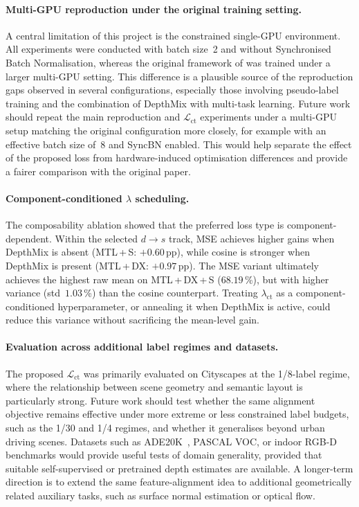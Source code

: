 \documentclass[
  oneside,
  author={Shijie Lu},
  degree={BSc},
  title={Label-Efficient Semantic Segmentation via Self-Supervised Depth Estimation and Cross-Task Consistency},
  unit={COMS30045},
  subtitle={}
]{dissertation}
\begin{document}
\paragraph{Multi-GPU reproduction under the original training setting.}
A central limitation of this project is the constrained single-GPU
environment. All experiments were conducted with batch size~2 and without
Synchronised Batch Normalisation, whereas the original framework of
\cite{hoyer2023improving} was trained under a larger multi-GPU setting.
This difference is a plausible source of the reproduction gaps observed
in several configurations, especially those involving pseudo-label
training and the combination of DepthMix with multi-task learning. Future
work should repeat the main reproduction and $\mathcal{L}_\text{ct}$
experiments under a multi-GPU setup matching the original configuration
more closely, for example with an effective batch size of~8 and SyncBN
enabled. This would help separate the effect of the proposed loss from
hardware-induced optimisation differences and provide a fairer comparison
with the original paper.

\paragraph{Component-conditioned $\lambda$ scheduling.}
The composability ablation showed that the preferred loss type is
component-dependent. Within the selected $d{\rightarrow}s$ track, MSE
achieves higher gains when DepthMix is absent (MTL\,+\,S:
$+0.60$\,pp), while cosine is stronger when DepthMix is present
(MTL\,+\,DX: $+0.97$\,pp). The MSE variant ultimately achieves the
highest raw mean on MTL\,+\,DX\,+\,S ($68.19$\,\%), but with higher
variance (std~$1.03$\,\%) than the cosine counterpart. Treating
$\lambda_\text{ct}$ as a component-conditioned hyperparameter, or
annealing it when DepthMix is active, could reduce this variance without
sacrificing the mean-level gain.

\paragraph{Evaluation across additional label regimes and datasets.}
The proposed $\mathcal{L}_\text{ct}$ was primarily evaluated on
Cityscapes at the 1/8-label regime, where the relationship between
scene geometry and semantic layout is particularly strong. Future work
should test whether the same alignment objective remains effective under
more extreme or less constrained label budgets, such as the 1/30 and
1/4 regimes, and whether it generalises beyond urban driving scenes.
Datasets such as ADE20K~\cite{zhou2019semantic}, PASCAL VOC, or indoor
RGB-D benchmarks would provide useful tests of domain generality,
provided that suitable self-supervised or pretrained depth estimates are
available. A longer-term direction is to extend the same feature-alignment
idea to additional geometrically related auxiliary tasks, such as surface
normal estimation or optical flow.
\end{document}
